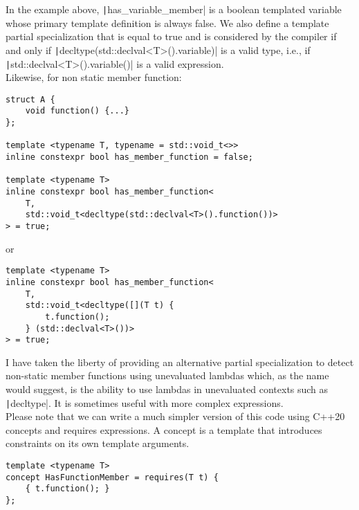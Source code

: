 In the example above, \texttt|has_variable_member| is a boolean templated variable whose primary template definition is always false. We also define a template partial specialization that is equal to true and is considered by the compiler if and only if
\texttt|decltype(std::declval<T>().variable)| is a valid type, i.e., if \texttt|std::declval<T>().variable()| is a valid expression. \\

Likewise, for non static member function:
\begin{verbatim}
struct A {
    void function() {...}
};

template <typename T, typename = std::void_t<>>
inline constexpr bool has_member_function = false;

template <typename T>
inline constexpr bool has_member_function<
    T,
    std::void_t<decltype(std::declval<T>().function())>
> = true;
\end{verbatim}

or

\begin{verbatim}
template <typename T>
inline constexpr bool has_member_function<
    T,
    std::void_t<decltype([](T t) {
        t.function();
    } (std::declval<T>())>
> = true;
\end{verbatim}

I have taken the liberty of providing an alternative partial specialization to detect non-static member functions using unevaluated lambdas which, as the name would suggest, is the ability to use lambdas in unevaluated contexts such as \texttt|decltype|. It is sometimes useful with more complex expressions. \\

Please note that we can write a much simpler version of this code using C++20 concepts and requires expressions.
A concept is a template that introduces constraints on its own template arguments.
\begin{verbatim}
template <typename T>
concept HasFunctionMember = requires(T t) {
    { t.function(); }
};
\end{verbatim}
